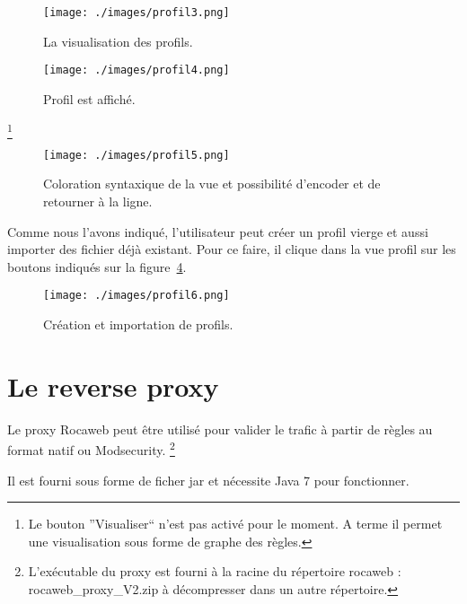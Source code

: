 \documentclass[a4paper,10pt,justified]{book}
\begin{document}
\begin{figure}
\texttt{[image: ./images/profil3.png]}
\label{profil3}
\caption{La visualisation des profils.}
\end{figure}


\begin{figure}
\texttt{[image: ./images/profil4.png]}
\label{profil4}
\caption{Profil est affiché.}
\end{figure} \footnote{Le bouton ''Visualiser`` n'est pas activé pour le moment. A terme il permet une visualisation sous forme de graphe des règles.}


\begin{figure}
\texttt{[image: ./images/profil5.png]}
\label{profil5}
\caption{Coloration syntaxique de la vue et possibilité d'encoder et de retourner à la ligne.}
\end{figure}

Comme nous l'avons indiqué, l'utilisateur peut créer un  profil vierge  et aussi importer des fichier déjà existant. 
Pour ce faire, il clique dans la vue profil sur les boutons indiqués sur la figure~\ref{profil6}. 
\begin{figure}
\texttt{[image: ./images/profil6.png]}
\label{profil6}
\caption{Création et importation de profils.}
\end{figure}


\section{Le reverse proxy}

Le proxy Rocaweb peut être utilisé pour valider le trafic à partir de règles au format natif ou Modsecurity.
\footnote{L'exécutable du proxy est fourni à la racine du répertoire rocaweb : rocaweb\_proxy\_V2.zip à décompresser dans un autre répertoire.} 

Il est fourni sous forme de ficher jar et nécessite Java 7 pour fonctionner.
\end{document}
